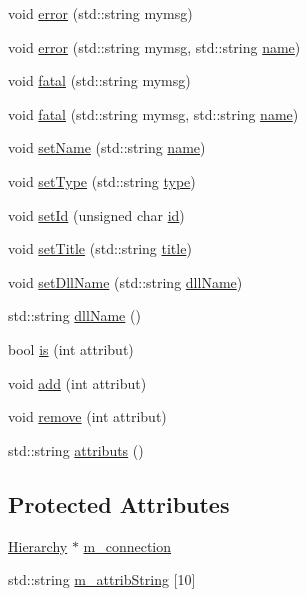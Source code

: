 \begin{DoxyCompactItemize}
\item 
void \hyperlink{classObject_a204a95f57818c0f811933917a30eff45}{error} (std\+::string mymsg)
\item 
void \hyperlink{classObject_ad7f6c457733082efa2f9ff5f5c8e119a}{error} (std\+::string mymsg, std\+::string \hyperlink{classObject_a300f4c05dd468c7bb8b3c968868443c1}{name})
\item 
void \hyperlink{classObject_aad5a16aac7516ce65bd5ec02ab07fc80}{fatal} (std\+::string mymsg)
\item 
void \hyperlink{classObject_ae62acd3d09f716220f75f252dc38bc9a}{fatal} (std\+::string mymsg, std\+::string \hyperlink{classObject_a300f4c05dd468c7bb8b3c968868443c1}{name})
\item 
void \hyperlink{classObject_ae30fea75683c2d149b6b6d17c09ecd0c}{set\+Name} (std\+::string \hyperlink{classObject_a300f4c05dd468c7bb8b3c968868443c1}{name})
\item 
void \hyperlink{classObject_aae534cc9d982bcb9b99fd505f2e103a5}{set\+Type} (std\+::string \hyperlink{classObject_a84f99f70f144a83e1582d1d0f84e4e62}{type})
\item 
void \hyperlink{classObject_a398fe08cba594a0ce6891d59fe4f159f}{set\+Id} (unsigned char \hyperlink{classMSOxxxx_a0f14b23d31d8e7647184e99a89600cc3}{id})
\item 
void \hyperlink{classObject_a89557dbbad5bcaa02652f5d7fa35d20f}{set\+Title} (std\+::string \hyperlink{classObject_a73a0f1a41828fdd8303dd662446fb6c3}{title})
\item 
void \hyperlink{classObject_a870c5af919958c2136623b2d7816d123}{set\+Dll\+Name} (std\+::string \hyperlink{classObject_a2e3947f2870094c332d7454117f3ec63}{dll\+Name})
\item 
std\+::string \hyperlink{classObject_a2e3947f2870094c332d7454117f3ec63}{dll\+Name} ()
\item 
bool \hyperlink{classAttrib_a704f26af560909ad22065083bb7d4c34}{is} (int attribut)
\item 
void \hyperlink{classAttrib_a235f773af19c900264a190b00a3b4ad7}{add} (int attribut)
\item 
void \hyperlink{classAttrib_a7d4ef7e32d93cb287792b87b857e79f3}{remove} (int attribut)
\item 
std\+::string \hyperlink{classAttrib_aee7bbf16b144887f196e1341b24f8a26}{attributs} ()
\end{DoxyCompactItemize}
\subsection*{Protected Attributes}
\begin{DoxyCompactItemize}
\item 
\hyperlink{classHierarchy}{Hierarchy} $\ast$ \hyperlink{classElement_abe3de7a5dbbc9a6dd2d7e012e5fdb266}{m\+\_\+connection}
\item 
std\+::string \hyperlink{classAttrib_a3414521d7a82476e874b25a5407b5e63}{m\+\_\+attrib\+String} \mbox{[}10\mbox{]}
\end{DoxyCompactItemize}
